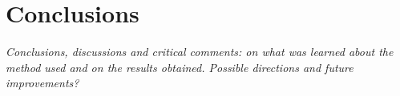 \section{Conclusions}
\label{conclusions}

\textit{Conclusions, discussions and critical comments: on what was learned about the method used and on the results obtained. Possible directions and future improvements?}
